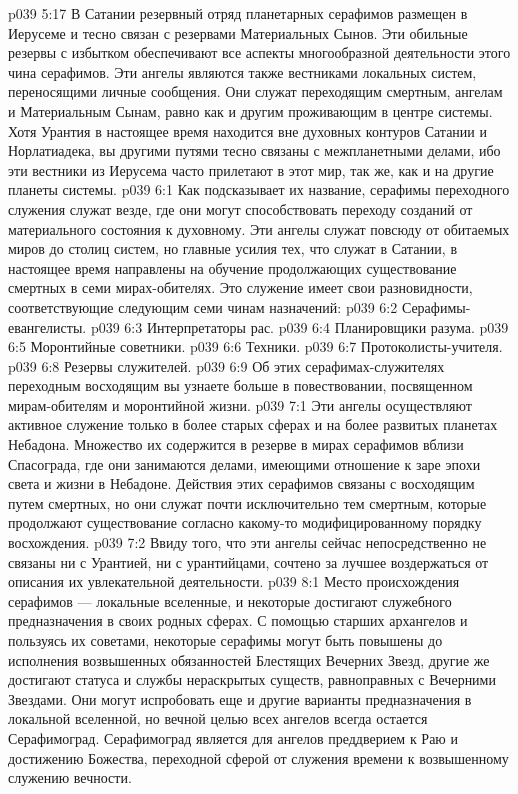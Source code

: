 \vs p039 5:17 \bibnobreakspace {} В Сатании резервный отряд планетарных серафимов размещен в Иерусеме и тесно связан с резервами Материальных Сынов. Эти обильные резервы с избытком обеспечивают все аспекты многообразной деятельности этого чина серафимов. Эти ангелы являются также вестниками локальных систем, переносящими личные сообщения. Они служат переходящим смертным, ангелам и Материальным Сынам, равно как и другим проживающим в центре системы. Хотя Урантия в настоящее время находится вне духовных контуров Сатании и Норлатиадека, вы другими путями тесно связаны с межпланетными делами, ибо эти вестники из Иерусема часто прилетают в этот мир, так же, как и на другие планеты системы.
\vs p039 6:1 Как подсказывает их название, серафимы переходного служения служат везде, где они могут способствовать переходу созданий от материального состояния к духовному. Эти ангелы служат повсюду от обитаемых миров до столиц систем, но главные усилия тех, что служат в Сатании, в настоящее время направлены на обучение продолжающих существование смертных в семи мирах\hyp{}обителях. Это служение имеет свои разновидности, соответствующие следующим семи чинам назначений:
\vs p039 6:2 \bibnobreakspace Серафимы\hyp{}евангелисты.
\vs p039 6:3 \bibnobreakspace Интерпретаторы рас.
\vs p039 6:4 \bibnobreakspace Планировщики разума.
\vs p039 6:5 \bibnobreakspace Моронтийные советники.
\vs p039 6:6 \bibnobreakspace Техники.
\vs p039 6:7 \bibnobreakspace Протоколисты\hyp{}учителя.
\vs p039 6:8 \bibnobreakspace Резервы служителей.
\vs p039 6:9 \pc Об этих серафимах\hyp{}служителях переходным восходящим вы узнаете больше в повествовании, посвященном мирам\hyp{}обителям и моронтийной жизни.
\vs p039 7:1 Эти ангелы осуществляют активное служение только в более старых сферах и на более развитых планетах Небадона. Множество их содержится в резерве в мирах серафимов вблизи Спасограда, где они занимаются делами, имеющими отношение к заре эпохи света и жизни в Небадоне. Действия этих серафимов связаны с восходящим путем смертных, но они служат почти исключительно тем смертным, которые продолжают существование согласно какому\hyp{}то модифицированному порядку восхождения.
\vs p039 7:2 Ввиду того, что эти ангелы сейчас непосредственно не связаны ни с Урантией, ни с урантийцами, сочтено за лучшее воздержаться от описания их увлекательной деятельности.
\vs p039 8:1 Место происхождения серафимов --- локальные вселенные, и некоторые достигают служебного предназначения в своих родных сферах. С помощью старших архангелов и пользуясь их советами, некоторые серафимы могут быть повышены до исполнения возвышенных обязанностей Блестящих Вечерних Звезд, другие же достигают статуса и службы нераскрытых существ, равноправных с Вечерними Звездами. Они могут испробовать еще и другие варианты предназначения в локальной вселенной, но вечной целью всех ангелов всегда остается Серафимоград. Серафимоград является для ангелов преддверием к Раю и достижению Божества, переходной сферой от служения времени к возвышенному служению вечности.
